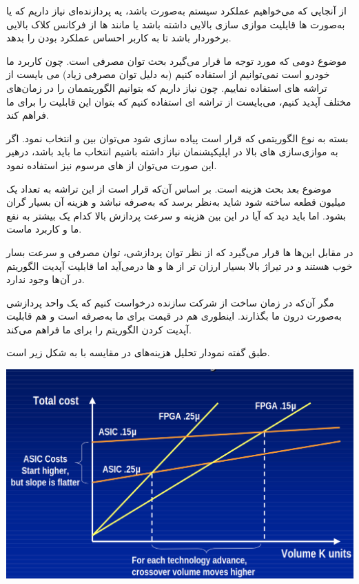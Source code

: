\begin{qsolve}
از آنجایی که می‌خواهیم عملکرد سیستم به‌صورت  باشد، یه پردازنده‌ای نیاز داریم که یا به‌صورت  ها قایلیت موازی سازی بالایی داشته باشد یا مانند  ها از فرکانس کلاک بالایی برخوردار باشد تا به کاربر احساس عملکرد  بودن را بدهد.

موضوع دومی که مورد توجه ما قرار می‌گیرد بحث توان مصرفی است. چون کاربرد ما خودرو است نمی‌توانیم از  استفاده کنیم (به دلیل توان مصرفی زیاد) می بایست از تراشه های  استفاده نماییم. چون نیاز داریم که بتوانیم الگوریتممان را در زمان‌های مختلف آپدید کنیم، می‌بایست از تراشه ای استفاده کنیم که بتوان این قابلیت را برای ما فراهم کند.

\end{qsolve}


\begin{qsolve}
	 بسته به نوع الگوریتمی که قرار است پیاده سازی شود می‌توان بین  و  انتخاب نمود. اگر به موازی‌سازی های بالا در اپلیکیشنمان نیاز داشته باشیم انتخاب ما باید  باشد، درهیر این صورت می‌توان از  های مرسوم نیز استفاده نمود.
	
	موضوع بعد بحث هزینه است. بر اساس آن‌که قرار است از این تراشه به تعداد یک میلیون قطعه ساخته شود شاید به‌نظر برسد که  به‌صرفه نباشد و هزینه آن بسیار گران بشود. اما باید دید که آیا در این  بین هزینه و سرعت پردازش بالا کدام یک بیشتر به نفع ما و کاربرد ماست.
	
	در مقابل این‌ها  ها قرار می‌گیرد که از نظر توان پردازشی، توان مصرفی و سرعت بسار خوب هستند و در تیراژ بالا بسیار ارزان تر از  ها و  ها در‌می‌آید اما قابلیت آپدیت الگوریتم در آن‌ها وجود ندارد.
	
	مگر آن‌که در زمان ساخت از شرکت سازنده درخواست کنیم که یک واحد پردازشی  به‌صورت  درون  ما بگذارند. اینطوری هم در قیمت برای ما به‌صرفه است و هم قابلیت آپدیت کردن الگوریتم را برای ما فراهم می‌کند.
	
	طبق گفته  نمودار تحلیل هزینه‌های  در مقایسه با  به شکل زیر است. 
	
	\begin{center}
		\includegraphics*[width=0.8\linewidth]{pics/img5.png}
		\label{نمودار هزینه‌های اف‌پی‌جی‌ای و ایسیک}
	\end{center}
	

\end{qsolve}
